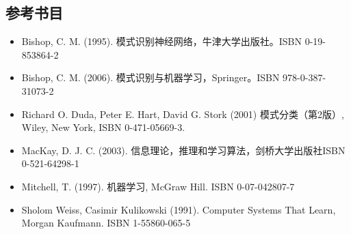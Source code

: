 \documentclass{article}
\begin{document}
\subsection{参考书目}
\begin{itemize}
\item    Bishop, C. M. (1995). 模式识别神经网络，牛津大学出版社。ISBN 0-19-853864-2
\item    Bishop, C. M. (2006). 模式识别与机器学习，Springer。ISBN 978-0-387-31073-2
\item    Richard O. Duda, Peter E. Hart, David G. Stork (2001) 模式分类（第2版）, Wiley, New York, ISBN 0-471-05669-3.
\item    MacKay, D. J. C. (2003). 信息理论，推理和学习算法，剑桥大学出版社ISBN 0-521-64298-1
\item    Mitchell, T. (1997). 机器学习, McGraw Hill. ISBN 0-07-042807-7
\item    Sholom Weiss, Casimir Kulikowski (1991). Computer Systems That Learn, Morgan Kaufmann. ISBN 1-55860-065-5
\end{itemize}
\end{document}
